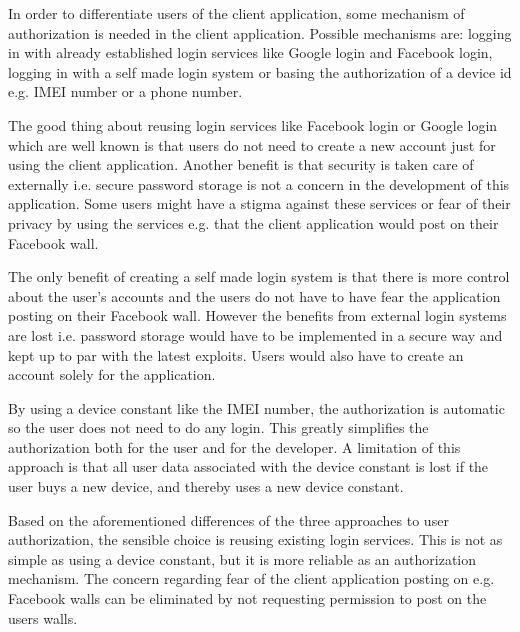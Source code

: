 In order to differentiate users of the client application, some mechanism of authorization is needed in the client application. Possible mechanisms are: logging in with already established login services like Google login and Facebook login, logging in with a self made login system or basing the authorization of a device id e.g. IMEI number or a phone number.

The good thing about reusing login services like Facebook login or Google login which are well known is that users do not need to create a new account just for using the client application. Another benefit is that security is taken care of externally i.e. secure password storage is not a concern in the development of this application. Some users might have a stigma against these services or fear of their privacy by using the services e.g. that the client application would post on their Facebook wall.

The only benefit of creating a self made login system is that there is more control about the user's accounts and the users do not have to have fear the application posting on their Facebook wall. However the benefits from external login systems are lost i.e. password storage would have to be implemented in a secure way and kept up to par with the latest exploits. Users would also have to create an account solely for the application.

By using a device constant like the IMEI number, the authorization is automatic so the user does not need to do any login. This greatly simplifies the authorization both for the user and for the developer. A limitation of this approach is that all user data associated with the device constant is lost if the user buys a new device, and thereby uses a new device constant.

Based on the aforementioned differences of the three approaches to user authorization, the sensible choice is reusing existing login services. This is not as simple as using a device constant, but it is more reliable as an authorization mechanism. The concern regarding fear of the client application posting on e.g. Facebook walls can be eliminated by not requesting permission to post on the users walls.

